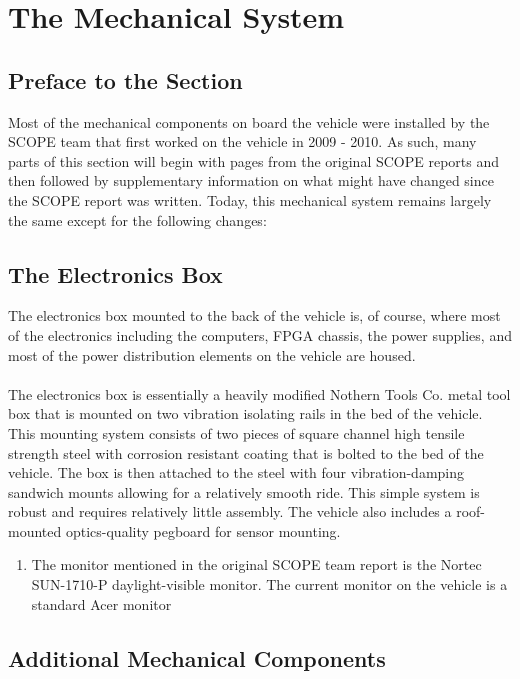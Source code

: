 \section{The Mechanical System}

\subsection{Preface to the Section}
Most of the mechanical components on board the vehicle were installed by the SCOPE team that first worked on the vehicle in 2009 - 2010. As such, many parts of this section will begin with pages from the original SCOPE reports and then followed by supplementary information on what might have changed since the SCOPE report was written. 
%
Today, this mechanical system remains largely the same except for the following changes:

\subsection{The Electronics Box}

The electronics box mounted to the back of the vehicle is, of course, where most of the electronics including the computers, FPGA chassis, the power supplies, and most of the power distribution elements on the vehicle are housed.\\ \\
%
\noindent The electronics box is essentially a heavily modified Nothern Tools Co. metal tool box that is mounted on two vibration isolating rails in the bed of the vehicle. This mounting system consists of two pieces of square channel high tensile strength steel with corrosion resistant coating that is bolted to the bed of the vehicle. The box is then attached to the steel with four vibration-damping sandwich mounts allowing for a relatively smooth ride. This simple system is robust and requires relatively little assembly. The vehicle also includes a roof-mounted optics-quality pegboard for sensor mounting. 

\begin{enumerate}
\item The monitor mentioned in the original SCOPE team report is the Nortec SUN-1710-P daylight-visible monitor. The current monitor on the vehicle is a standard Acer monitor
\end{enumerate}

\newpage



\newpage

\subsection{Additional Mechanical Components}